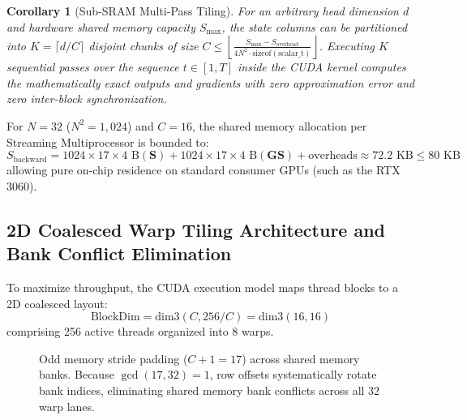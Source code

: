 \documentclass[11pt,a4paper]{article}
\newtheorem{corollary}{Corollary}[theorem]
\begin{document}
\begin{corollary}[Sub-SRAM Multi-Pass Tiling]
\label{cor:multipass_sram}
For an arbitrary head dimension $d$ and hardware shared memory capacity $S_{\text{max}}$, the state columns can be partitioned into $K = \lceil d / C \rceil$ disjoint chunks of size $C \le \left\lfloor \frac{S_{\text{max}} - S_{\text{overhead}}}{4 N^2 \cdot \text{sizeof}(\text{scalar\_t})} \right\rfloor$. Executing $K$ sequential passes over the sequence $t \in [1, T]$ inside the CUDA kernel computes the mathematically exact outputs and gradients with zero approximation error and zero inter-block synchronization.
\end{corollary}

For $N=32$ ($N^2 = 1,024$) and $C=16$, the shared memory allocation per Streaming Multiprocessor is bounded to:
\begin{equation}
    S_{\text{backward}} = 1024 \times 17 \times 4\text{ B} (\mathbf{S}) + 1024 \times 17 \times 4\text{ B} (\mathbf{GS}) + \text{overheads} \approx 72.2\text{ KB} \le 80\text{ KB}
\end{equation}
allowing pure on-chip residence on standard consumer GPUs (such as the RTX 3060).

\subsection{2D Coalesced Warp Tiling Architecture and Bank Conflict Elimination}
To maximize throughput, the CUDA execution model maps thread blocks to a 2D coalesced layout:
\begin{equation}
    \text{BlockDim} = \text{dim3}(C, 256 / C) = \text{dim3}(16, 16)
\end{equation}
comprising 256 active threads organized into 8 warps.

\begin{figure}[H]
\centering
{}
\caption{Odd memory stride padding ($C+1 = 17$) across shared memory banks. Because $\gcd(17, 32) = 1$, row offsets systematically rotate bank indices, eliminating shared memory bank conflicts across all 32 warp lanes.}
\label{fig:bank_conflict_stride}
\end{figure}
\end{document}
